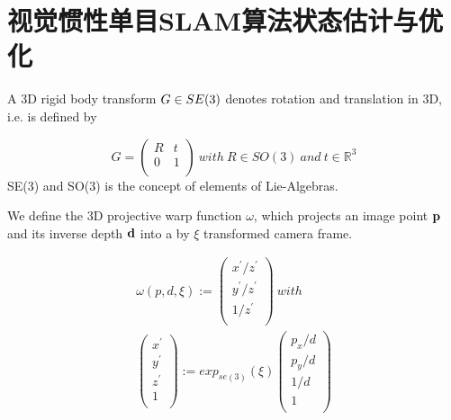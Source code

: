 \section{视觉惯性单目SLAM算法状态估计与优化}
A 3D rigid body transform $G{\rm{ }} \in {\rm{ }}SE(3)$  denotes rotation and translation in 3D,  i.e. is defined by

\begin{equation}
G=\left(
    \begin{array}{cc}
      R & t \\
      0 & 1 \\
    \end{array}
  \right)
    \ with
    \ R\in SO(3)
    \ and
    \ t\in {\mathbb{R}}^{3}
\end{equation}
SE(3) and SO(3) is the concept of elements of Lie-Algebras.

We define the 3D projective warp function $\omega $, which projects an image point ${\bf{p}}$ and its inverse depth ${\bf{d}}$ into a by $\xi $ transformed camera frame.

\begin{equation}
\begin{split}
\omega(p,d,\xi):= \left(
                     \begin{array}{c}
                       x^{'}/z^{'} \\
                       y^{'}/z^{'} \\
                       1/z^{'} \\
                     \end{array}
                   \right) \ with \\
                   \left(
                     \begin{array}{c}
                       x^{'} \\
                       y^{'} \\
                       z^{'} \\
                       1 \\
                     \end{array}
                   \right):=\!exp_{\!se(\!3\!)}(\xi)
                   \left(
                     \begin{array}{c}
                       p_{x}/d \\
                       p_{y}/d  \\
                       1/d  \\
                       1 \\
                     \end{array}
                   \right)
\end{split}
\end{equation}

